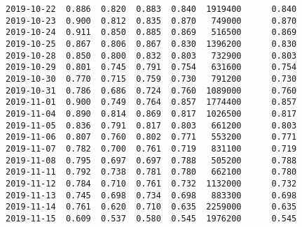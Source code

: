 \documentclass[11pt]{article}
\begin{document}
\begin{Verbatim}[commandchars=\\\{\}]
2019-10-22  0.886  0.820  0.883  0.840  1919400      0.840
2019-10-23  0.900  0.812  0.835  0.870   749000      0.870
2019-10-24  0.911  0.850  0.885  0.869   516500      0.869
2019-10-25  0.867  0.806  0.867  0.830  1396200      0.830
2019-10-28  0.850  0.800  0.832  0.803   732900      0.803
2019-10-29  0.801  0.745  0.791  0.754   631600      0.754
2019-10-30  0.770  0.715  0.759  0.730   791200      0.730
2019-10-31  0.786  0.686  0.724  0.760  1089000      0.760
2019-11-01  0.900  0.749  0.764  0.857  1774400      0.857
2019-11-04  0.890  0.814  0.869  0.817  1026500      0.817
2019-11-05  0.836  0.791  0.817  0.803   661200      0.803
2019-11-06  0.807  0.760  0.802  0.771   553200      0.771
2019-11-07  0.782  0.700  0.761  0.719   831100      0.719
2019-11-08  0.795  0.697  0.697  0.788   505200      0.788
2019-11-11  0.792  0.738  0.781  0.780   662100      0.780
2019-11-12  0.784  0.710  0.761  0.732  1132000      0.732
2019-11-13  0.745  0.698  0.734  0.698   883300      0.698
2019-11-14  0.761  0.620  0.710  0.635  2259000      0.635
2019-11-15  0.609  0.537  0.580  0.545  1976200      0.545


\end{Verbatim}
\end{document}

